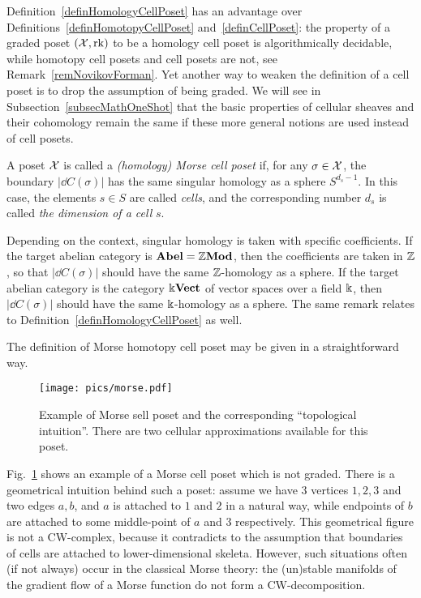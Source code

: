 Definition~\ref{definHomologyCellPoset} has an advantage over Definitions~\ref{definHomotopyCellPoset} and~\ref{definCellPoset}: the property of a graded poset $(\mathcal{X},\operatorname{rk})$ to be a homology cell poset is algorithmically decidable, while homotopy cell posets and cell posets are not, see Remark~\ref{remNovikovForman}. Yet another way to weaken the definition of a cell poset is to drop the assumption of being graded. We will see in Subsection~\ref{subsecMathOneShot} that the basic properties of cellular sheaves and their cohomology remain the same if these more general notions are used instead of cell posets.

\begin{defin}\label{definMorseHomologyCellPoset}
A poset $\mathcal{X}$ is called a \emph{(homology) Morse cell poset} if, for any $\sigma\in \mathcal{X}$, the boundary $|\dd C(\sigma)|$ has the same singular homology as a sphere $S^{d_s-1}$. In this case, the elements $s\in S$ are called \emph{cells}, and the corresponding number $d_s$ is called \emph{the dimension of a cell} $s$.
\end{defin}

\begin{rem}\label{remHomologyInContext}
Depending on the context, singular homology is taken with specific coefficients. If the target abelian category is $\mathbf{Abel}=\mathbb{Z}\mathbf{Mod}$, then the coefficients are taken in $\mathbb{Z}$, so that $|\dd C(\sigma)|$ should have the same $\mathbb{Z}$-homology as a sphere. If the target abelian category is the category $\Bbbk\mathbf{Vect}$ of vector spaces over a field $\Bbbk$, then $|\dd C(\sigma)|$ should have the same $\Bbbk$-homology as a sphere. The same remark relates to Definition~\ref{definHomologyCellPoset} as well.
\end{rem}

The definition of Morse homotopy cell poset may be given in a straightforward way.

\begin{figure}
  \centering
  \texttt{[image: pics/morse.pdf]}
  \caption{Example of Morse sell poset and the corresponding ``topological intuition''. There are two cellular approximations available for this poset.}\label{figElementaryMorse}
\end{figure}

\begin{ex}\label{exMorseExample}
Fig.~\ref{figElementaryMorse} shows an example of a Morse cell poset which is not graded. There is a geometrical intuition behind such a poset: assume we have 3 vertices $1,2,3$ and two edges $a,b$, and $a$ is attached to $1$ and $2$ in a natural way, while endpoints of $b$ are attached to some middle-point of $a$ and $3$ respectively. This geometrical figure is not a CW-complex, because it contradicts to the assumption that boundaries of cells are attached to lower-dimensional skeleta. However, such situations often (if not always) occur in the classical Morse theory: the (un)stable manifolds of the gradient flow of a Morse function do not form a CW-decomposition.
\end{ex}

